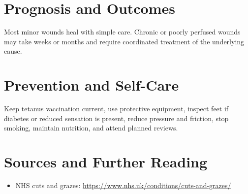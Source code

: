 \section*{Prognosis and Outcomes}
Most minor wounds heal with simple care. Chronic or poorly perfused wounds may take weeks or months and require coordinated treatment of the underlying cause.
\section*{Prevention and Self-Care}
Keep tetanus vaccination current, use protective equipment, inspect feet if diabetes or reduced sensation is present, reduce pressure and friction, stop smoking, maintain nutrition, and attend planned reviews.
\section*{Sources and Further Reading}
\begin{itemize}
    \item NHS cuts and grazes: \url{https://www.nhs.uk/conditions/cuts-and-grazes/}
\end{itemize}
